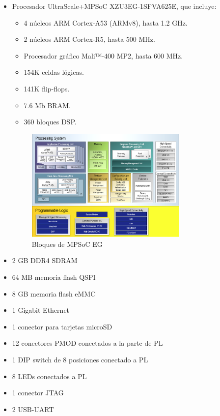 \begin{itemize}
  \item Procesador UltraScale+\texttrademark MPSoC XZU3EG-1SFVA625E, que incluye:
  \begin{itemize}
    \item 4 núcleos ARM Cortex-A53 (ARMv8), hasta 1.2 GHz.
    \item 2 núcleos ARM Cortex-R5, hasta 500 MHz.
    \item Procesador gráfico Mali™-400 MP2, hasta 600 MHz.
    \item 154K celdas lógicas.
    \item 141K flip-flops.
    \item 7.6 Mb \acrshort{BRAM}.
    \item 360 bloques \acrshort{DSP}.
    \end{itemize}

    \begin{figure}[h]
    	\centering
    	\includegraphics[width=0.75\textwidth]{recursos/mpsoc_arch.png}
    	\caption{Bloques de MPSoC EG}
    	\label{fig:mpsoc_arch}
    \end{figure}

  \item 2 GB \acrshort{DDR}4 \acrshort{SDRAM}
  \item 64 MB memoria flash \acrshort{QSPI}
  \item 8 GB memoria flash \acrshort{eMMC}
  \item 1 Gigabit Ethernet
  \item 1 conector para tarjetas microSD
  \item 12 conectores \acrshort{PMOD} conectados a la parte de \acrshort{PL}
  \item 1 \acrshort{DIP} switch de 8 posiciones conectado a \acrshort{PL}
  \item 8 LEDs conectados a \acrshort{PL}
  \item 1 conector \acrshort{JTAG}
  \item 2 \acrshort{USB}-\acrshort{UART}
\end{itemize}

